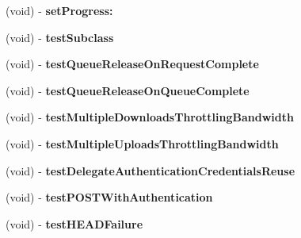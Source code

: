 \begin{DoxyCompactItemize}
\item 
\hypertarget{interface_a_s_i_network_queue_tests_aaa3ee5989847c5200d079241b5527795}{
(void) -\/ {\bfseries set\-Progress\-:}}
\label{interface_a_s_i_network_queue_tests_aaa3ee5989847c5200d079241b5527795}

\item 
\hypertarget{interface_a_s_i_network_queue_tests_a6c75d4f9034d8f96da30002fa7c39f6a}{
(void) -\/ {\bfseries test\-Subclass}}
\label{interface_a_s_i_network_queue_tests_a6c75d4f9034d8f96da30002fa7c39f6a}

\item 
\hypertarget{interface_a_s_i_network_queue_tests_a6ebc6405b8f6639be717def3dcbcd617}{
(void) -\/ {\bfseries test\-Queue\-Release\-On\-Request\-Complete}}
\label{interface_a_s_i_network_queue_tests_a6ebc6405b8f6639be717def3dcbcd617}

\item 
\hypertarget{interface_a_s_i_network_queue_tests_a8367da7729b914e691602cbfbb0cd4d6}{
(void) -\/ {\bfseries test\-Queue\-Release\-On\-Queue\-Complete}}
\label{interface_a_s_i_network_queue_tests_a8367da7729b914e691602cbfbb0cd4d6}

\item 
\hypertarget{interface_a_s_i_network_queue_tests_afecabb41732addf7e0b63960536af284}{
(void) -\/ {\bfseries test\-Multiple\-Downloads\-Throttling\-Bandwidth}}
\label{interface_a_s_i_network_queue_tests_afecabb41732addf7e0b63960536af284}

\item 
\hypertarget{interface_a_s_i_network_queue_tests_a3c936cbdc4d5d95c086acccc6b61a277}{
(void) -\/ {\bfseries test\-Multiple\-Uploads\-Throttling\-Bandwidth}}
\label{interface_a_s_i_network_queue_tests_a3c936cbdc4d5d95c086acccc6b61a277}

\item 
\hypertarget{interface_a_s_i_network_queue_tests_ad451f41961e411ca4e0a493564f3782e}{
(void) -\/ {\bfseries test\-Delegate\-Authentication\-Credentials\-Reuse}}
\label{interface_a_s_i_network_queue_tests_ad451f41961e411ca4e0a493564f3782e}

\item 
\hypertarget{interface_a_s_i_network_queue_tests_aa73ecf9606cf1826f4137aef4ff343be}{
(void) -\/ {\bfseries test\-P\-O\-S\-T\-With\-Authentication}}
\label{interface_a_s_i_network_queue_tests_aa73ecf9606cf1826f4137aef4ff343be}

\item 
\hypertarget{interface_a_s_i_network_queue_tests_aa50e545358ffc84eea2a4f61e6d782eb}{
(void) -\/ {\bfseries test\-H\-E\-A\-D\-Failure}}
\label{interface_a_s_i_network_queue_tests_aa50e545358ffc84eea2a4f61e6d782eb}


\end{DoxyCompactItemize}
